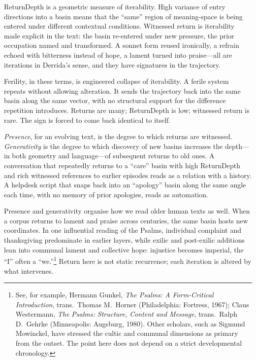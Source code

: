 \documentclass[12pt,a4paper]{article}
\begin{document}
ReturnDepth is a geometric measure of iterability. High variance of entry directions into a basin means that the ``same'' region of meaning-space is being entered under different contextual conditions. Witnessed return is iterability made explicit in the text: the basin re-entered under new pressure, the prior occupation named and transformed. A sonnet form reused ironically, a refrain echoed with bitterness instead of hope, a lament turned into praise---all are iterations in Derrida's sense, and they have signatures in the trajectory.

Ferility, in these terms, is engineered collapse of iterability. A ferile system repeats without allowing alteration. It sends the trajectory back into the same basin along the same vector, with no structural support for the difference repetition introduces. Returns are many; ReturnDepth is low; witnessed return is rare. The sign is forced to come back identical to itself.

\emph{Presence}, for an evolving text, is the degree to which returns are witnessed. \emph{Generativity} is the degree to which discovery of new basins increases the depth---in both geometry and language---of subsequent returns to old ones. A conversation that repeatedly returns to a ``care'' basin with high ReturnDepth and rich witnessed references to earlier episodes reads as a relation with a history. A helpdesk script that snaps back into an ``apology'' basin along the same angle each time, with no memory of prior apologies, reads as automation.

Presence and generativity organise how we read older human texts as well. When a corpus returns to lament and praise across centuries, the same basin hosts new coordinates. In one influential reading of the Psalms, individual complaint and thanksgiving predominate in earlier layers, while exilic and post-exilic additions lean into communal lament and collective hope: injustice becomes imperial, the ``I'' often a ``we.''\footnote{See, for example, Hermann Gunkel, \emph{The Psalms: A Form-Critical Introduction}, trans.\ Thomas M.\ Horner (Philadelphia: Fortress, 1967); Claus Westermann, \emph{The Psalms: Structure, Content and Message}, trans.\ Ralph D.\ Gehrke (Minneapolis: Augsburg, 1980). Other scholars, such as Sigmund Mowinckel, have stressed the cultic and communal dimensions as primary from the outset. The point here does not depend on a strict developmental chronology.} Return here is not static recurrence; each iteration is altered by what intervenes.
\end{document}
